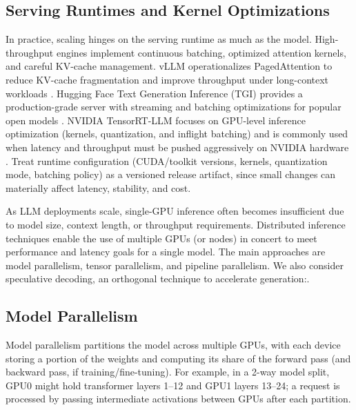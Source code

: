 \subsection{Serving Runtimes and Kernel Optimizations}\label{sec:serving-runtimes-scaling}
In practice, scaling hinges on the serving runtime as much as the model. High-throughput engines implement continuous batching, optimized attention kernels, and careful KV-cache management. vLLM operationalizes PagedAttention to reduce KV-cache fragmentation and improve throughput under long-context workloads \cite{vllm_pagedattention}. Hugging Face Text Generation Inference (TGI) provides a production-grade server with streaming and batching optimizations for popular open models \cite{tgi_docs}. NVIDIA TensorRT-LLM \cite{tensorrt_llm_docs} focuses on GPU-level inference optimization (kernels, quantization, and inflight batching) and is commonly used when latency and throughput must be pushed aggressively on NVIDIA hardware \cite{tensorrt_llm_docs}. Treat runtime configuration (CUDA/toolkit versions, kernels, quantization mode, batching policy) as a versioned release artifact, since small changes can materially affect latency, stability, and cost.

As LLM deployments scale, single-GPU inference often becomes insufficient due to model size, context length, or throughput requirements. Distributed inference techniques enable the use of multiple GPUs (or nodes) in concert to meet performance and latency goals for a single model. The main approaches are model parallelism, tensor parallelism, and pipeline parallelism. We also consider speculative decoding, an orthogonal technique to accelerate generation:\cite{vllm_pagedattention}.

\subsection{Model Parallelism}
\label{sec:scaling-model-parallelism}
Model parallelism partitions the model across multiple GPUs, with each device storing a portion of the weights and computing its share of the forward pass (and backward pass, if training/fine-tuning). For example, in a 2-way model split, GPU0 might hold transformer layers 1--12 and GPU1 layers 13--24; a request is processed by passing intermediate activations between GPUs after each partition.

